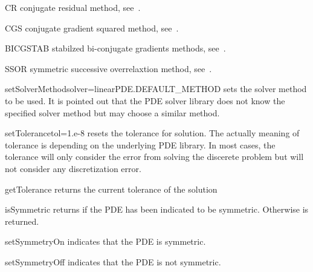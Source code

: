 \begin{memberdesc}[LinearPDE]{CR}
conjugate residual method, see~. 
\end{memberdesc}

\begin{memberdesc}[LinearPDE]{CGS}
conjugate gradient squared method, see~.
\end{memberdesc}

\begin{memberdesc}[LinearPDE]{BICGSTAB}
stabilzed bi-conjugate gradients methods, see~. 
\end{memberdesc}

\begin{memberdesc}[LinearPDE]{SSOR}
symmetric successive overrelaxtion method, see~.
\end{memberdesc}

\begin{methoddesc}[LinearPDE]{setSolverMethod}{solver=linearPDE.DEFAULT_METHOD}
sets the solver method to be used. It is pointed out that the PDE solver library
does not know the specified solver method but may choose a similar method. 
\end{methoddesc}

\begin{methoddesc}[LinearPDE]{setTolerance}{tol=1.e-8}
resets the tolerance for solution. The actually meaning of tolerance is
depending on the underlying PDE library. In most cases, the tolerance 
will only consider the error from solving the discerete problem but will
not consider any discretization error.
\end{methoddesc}

\begin{methoddesc}[LinearPDE]{getTolerance}{}
returns the current tolerance of the solution
\end{methoddesc}

\begin{methoddesc}[LinearPDE]{isSymmetric}{}
returns \True if the PDE has been indicated to be symmetric.
Otherwise \False is returned.
\end{methoddesc}

\begin{methoddesc}[LinearPDE]{setSymmetryOn}{}
indicates that the PDE is symmetric.
\end{methoddesc}

\begin{methoddesc}[LinearPDE]{setSymmetryOff}{}
indicates that the PDE is not symmetric.
\end{methoddesc}

